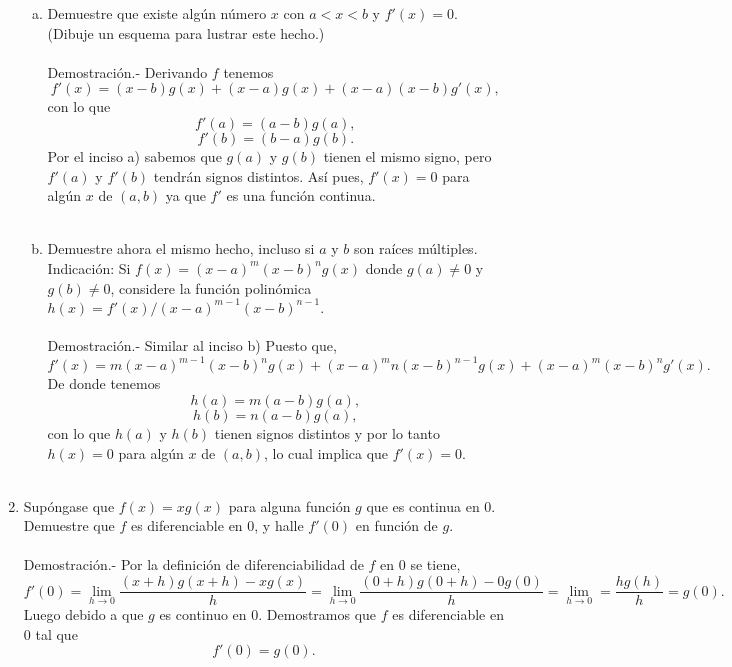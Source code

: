 \begin{enumerate}[\bfseries 1.]
\begin{enumerate}[(a)]
	     \item Demuestre que existe algún número $x$ con $a<x<b$ y $f'(x)=0$. (Dibuje un esquema para lustrar este hecho.)\\\\
		 Demostración.-\; Derivando $f$ tenemos
		 $$f'(x)=(x-b)g(x)+(x-a)g(x)+(x-a)(x-b)g'(x),$$
		 con lo que 
		 $$f'(a)=(a-b)g(a),$$
		 $$f'(b)=(b-a)g(b).$$
		 Por el inciso a) sabemos que $g(a)$ y $g(b)$ tienen el mismo signo, pero $f'(a)$ y $f'(b)$ tendrán signos distintos. Así pues, $f'(x)=0$ para algún $x$ de $(a,b)$ ya que $f'$ es una función continua.\\\\

	     \item Demuestre ahora el mismo hecho, incluso si $a$ y $b$ son raíces múltiples. Indicación: Si $f(x)=(x-a)^m (x-b)^n g(x)$ donde $g(a)\neq 0$ y $g(b)\neq 0$, considere la función polinómica $h(x)=f'(x)/(x-a)^{m-1}(x-b)^{n-1}.$\\\\
		 Demostración.-\; Similar al inciso b) Puesto que,
		 $$f'(x)=m(x-a)^{m-1}(x-b)^n g(x) + (x-a)^m n(x-b)^{n-1}g(x)+(x-a)^m (x-b)^n g'(x).$$
		 De donde tenemos
		 $$h(a)=m(a-b)g(a),$$
		 $$h(b)=n(a-b)g(a),$$
		 con lo que $h(a)$ y $h(b)$ tienen signos distintos y por lo tanto $h(x)=0$ para algún $x$ de $(a,b)$, lo cual implica que $f'(x)=0.$\\\\

	 \end{enumerate}

     \item Supóngase que $f(x)=xg(x)$ para alguna función $g$ que es continua en $0$. Demuestre que $f$ es diferenciable en $0$, y halle $f'(0)$ en función de $g$.\\\\
	 Demostración.-\; Por la definición de diferenciabilidad de $f$ en $0$ se tiene,
	 $$f'(0)=\lim_{h\to 0} \dfrac{(x+h)g(x+h)-xg(x)}{h} =\lim_{h\to 0} \dfrac{(0+h)g(0+h)-0g(0)}{h} = \lim_{h\to 0} =\dfrac{hg(h)}{h} = g(0).$$
	 Luego debido a que $g$ es continuo en $0$. Demostramos que $f$ es diferenciable en $0$ tal que 
	 $$f'(0)=g(0).$$\\


\end{enumerate}
